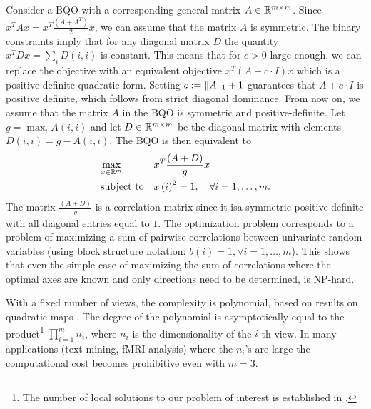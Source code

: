 Consider a BQO with a corresponding general matrix $A \in \mathbb{R}^{m\times m}$. Since $x^T A x = x^T
\frac{\left(A + A^T\right)}{2} x$, we can assume that the matrix $A$ is
symmetric. The binary constraints imply that for any diagonal
matrix $D$ the quantity $x^T D x = \sum_i D\left(i,i\right)$ is
constant. This means that for $c > 0$ large enough, we can
replace the objective with an equivalent objective $x^T \left(A + c
\cdot I\right) x$ which is a positive-definite quadratic form. Setting $c := \lVert A\rVert_1 + 1$ 
guarantees that $A + c\cdot I$ is positive definite, which follows from 
strict diagonal dominance. From now on, we assume that the matrix $A$ in the BQO is symmetric and
positive-definite.  Let $g = \max_i{A\left(i,i\right)}$ and let $D \in
\mathbb{R}^{m\times m}$ be the diagonal matrix with elements 
$D\left(i,i\right) = g - A\left(i,i\right)$. The BQO is then equivalent to
\begin{equation}\label{eq:binqpcor}
\begin{aligned}
& \underset{x \in \mathbb{R}^m}{\text{max}}
& & x^T \frac{\left(A + D\right)}{g} x  \\
& \text{subject to}
& & x\left(i\right)^2 = 1,  \quad\forall i =1,\ldots,m.\\
\end{aligned}
\end{equation}
The matrix $\frac{\left(A + D\right)}{g}$ is a correlation matrix since it
isa symmetric positive-definite with all diagonal entries
equal to $1$. The optimization problem corresponds to a problem
of maximizing a sum of pairwise correlations between univariate
random variables (using block structure notation: $b\left(i\right) = 1,
\forall i = 1,\ldots, m$). This shows that even the simple case
of maximizing the sum of correlations where the optimal axes are
known and only directions need to be determined, is NP-hard.

With a fixed number of views, the complexity is polynomial, based on results on 
quadratic maps \cite{Grigoriev}. The degree of the polynomial is asymptotically 
equal to the product\footnote{The number of local solutions to our problem of 
interest is established in \cite{Chu}.} $\prod_{i=1}^m n_i$, where $n_i$ is 
the dimensionality of the $i$-th view. In many applications (text mining, fMRI 
analysis) where the $n_i$'s are large the computational cost becomes prohibitive 
even with $m=3$.

